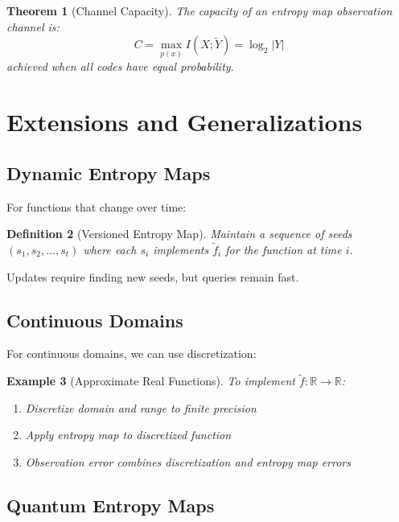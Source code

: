 \documentclass[11pt,final,hidelinks]{article}
\newtheorem{theorem}{Theorem}[section]
\newtheorem{definition}[theorem]{Definition}
\newtheorem{example}[theorem]{Example}
\newcommand{\obs}[1]{\widetilde{#1}}  %
\newcommand{\Card}[1]{\lvert#1\rvert}
\begin{document}
\begin{theorem}[Channel Capacity]
The capacity of an entropy map observation channel is:
\begin{equation}
C = \max_{p(x)} I(X; \obs{Y}) = \log_2 \Card{Y}
\end{equation}
achieved when all codes have equal probability.
\end{theorem}

\section{Extensions and Generalizations}

\subsection{Dynamic Entropy Maps}

For functions that change over time:

\begin{definition}[Versioned Entropy Map]
Maintain a sequence of seeds $(s_1, s_2, \ldots, s_t)$ where each $s_i$ implements $\obs{f}_i$ for the function at time $i$.
\end{definition}

Updates require finding new seeds, but queries remain fast.

\subsection{Continuous Domains}

For continuous domains, we can use discretization:

\begin{example}[Approximate Real Functions]
To implement $\obs{f}: \mathbb{R} \to \mathbb{R}$:
\begin{enumerate}
    \item Discretize domain and range to finite precision
    \item Apply entropy map to discretized function
    \item Observation error combines discretization and entropy map errors
\end{enumerate}
\end{example}

\subsection{Quantum Entropy Maps}
\end{document}
